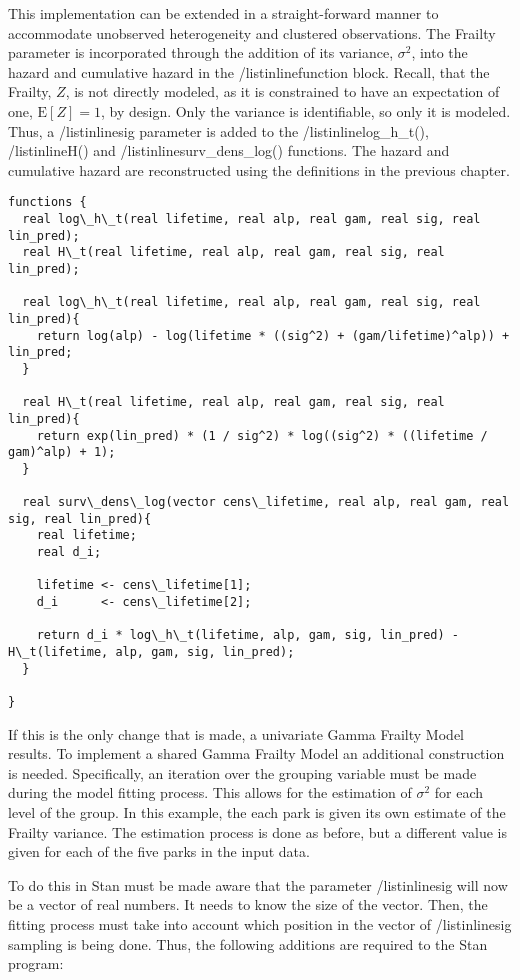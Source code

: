 This implementation can be extended in a straight-forward manner to accommodate unobserved heterogeneity and clustered observations. The Frailty parameter is incorporated through the addition of its variance, $\sigma^2$, into the hazard and cumulative hazard in the /listinline{function} block. Recall, that the Frailty, $Z$, is not directly modeled, as it is constrained to have an expectation of one, $\mathrm{E}[Z]=1$, by design. Only the variance is identifiable, so only it is modeled. Thus, a /listinline{sig} parameter is added to the /listinline{log\_h\_t()}, /listinline{H()} and /listinline{surv\_dens\_log()} functions. The hazard and cumulative hazard are reconstructed using the definitions in the previous chapter. 

\begin{lstlisting}
functions {
  real log\_h\_t(real lifetime, real alp, real gam, real sig, real lin_pred);
  real H\_t(real lifetime, real alp, real gam, real sig, real lin_pred);
  
  real log\_h\_t(real lifetime, real alp, real gam, real sig, real lin_pred){
    return log(alp) - log(lifetime * ((sig^2) + (gam/lifetime)^alp)) + lin_pred;
  }
  
  real H\_t(real lifetime, real alp, real gam, real sig, real lin_pred){
    return exp(lin_pred) * (1 / sig^2) * log((sig^2) * ((lifetime / gam)^alp) + 1);
  }
  
  real surv\_dens\_log(vector cens\_lifetime, real alp, real gam, real sig, real lin_pred){
    real lifetime;
    real d_i;
    
    lifetime <- cens\_lifetime[1];
    d_i      <- cens\_lifetime[2];
  
    return d_i * log\_h\_t(lifetime, alp, gam, sig, lin_pred) - H\_t(lifetime, alp, gam, sig, lin_pred);
  }

}
\end{lstlisting}


If this is the only change that is made, a univariate Gamma Frailty Model results. To implement a shared Gamma Frailty Model an additional construction is needed. Specifically, an iteration over the grouping variable must be made during the model fitting process. This allows for the estimation of $\sigma^2$ for each level of the group. In this example, the each park is given its own estimate of the Frailty variance. The estimation process is done as before, but a different value is given for each of the five parks in the input data.

To do this in Stan must be made aware that the parameter /listinline{sig} will now be a vector of real numbers. It needs to know the size of the vector. Then, the fitting process must take into account which position in the vector of /listinline{sig} sampling is being done. Thus, the following additions are required to the Stan program:



